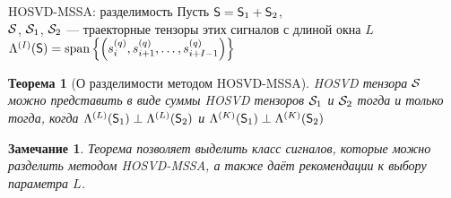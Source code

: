 \documentclass[pdf, unicode, 9pt, notheorems, handout]{beamer}
\newtheorem{theorem}{Теорема}
\newtheorem{remark}{Замечание}
\begin{document}
\begin{frame}{HOSVD-MSSA: разделимость}
  Пусть $\mathsf{S} = \mathsf{S}_1 + \mathsf{S}_2$, \\
  $\mathcal{S}$, $\mathcal{S}_1$, $\mathcal{S}_2$ --- траекторные тензоры этих сигналов с длиной
  окна $L$\\ \vspace{0.2cm}
  $\Lambda^{(I)}(\mathsf{S}) = \operatorname{span}\left\{\left(s_i^{(q)},
  s_{i+1}^{(q)}, \ldots, s_{i + I - 1}^{(q)}\right)\right\}$
  \begin{theorem}[О разделимости методом HOSVD-MSSA]
    \textup{HOSVD} тензора $\mathcal{S}$ можно представить в виде суммы
    \textup{HOSVD} тензоров $\mathcal{S}_1$ и
    $\mathcal{S}_2$ тогда и только тогда, когда
    $\Lambda^{(L)}(\mathsf{S}_1) \perp \Lambda^{(L)}(\mathsf{S}_2)$ и
    $\Lambda^{(K)}(\mathsf{S}_1)\perp\Lambda^{(K)}(\mathsf{S}_2)$
  \end{theorem}
  \vspace{0.2cm}
  \begin{remark}
    Теорема позволяет выделить класс сигналов, которые можно
    разделить методом \textup{HOSVD-MSSA},
    а также даёт рекомендации к выбору параметра $L$.
  \end{remark}
\end{frame}
\end{document}

